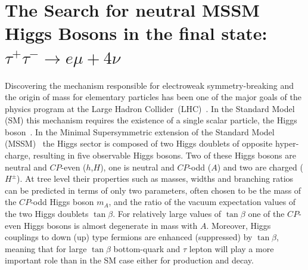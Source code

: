 \chapter[Neutral MSSM Higgs Search...]{The Search for neutral MSSM Higgs Bosons in the final state:
$\tau^{+}\tau^{-} \rightarrow e \mu + 4\nu$}

Discovering the mechanism responsible for electroweak
symmetry-breaking and the origin of mass for elementary particles has been
one of the major goals of the physics program at the Large Hadron
Collider~(LHC)~\cite{LHC}.  In the Standard Model (SM) this mechanism
requires the existence of a single scalar particle, the Higgs
boson~\cite{ENGLERT,HIGGS,HIGGS2,HIGGS3,Guralnik:1964eu}.
In the Minimal Supersymmetric extension of the Standard Model
(MSSM)~\cite{MSSM1, MSSM2} the Higgs sector is composed of two Higgs
doublets of opposite hyper-charge, resulting in five observable Higgs
bosons.  Two of these Higgs bosons are neutral and $CP$-even
($h$,$H$), one is neutral and $CP$-odd ($A$) and two are charged
($H^\pm$).  At tree level their properties such as masses, widths and
branching ratios can be predicted in terms of only two parameters,
often chosen to be the mass of the $CP$-odd Higgs boson $m_A$, and
the ratio of the vacuum expectation values of the two Higgs doublets
$\tan\beta$.  For relatively large values of $\tan\beta$ one of the
$CP$-even Higgs bosons is almost degenerate in mass with
$A$. Moreover, Higgs couplings to down (up) type fermions are enhanced
(suppressed) by $\tan\beta$, meaning that for large $\tan\beta$
bottom-quark and $\tau$ lepton will play a more important role than in
the SM case either for production and decay.


